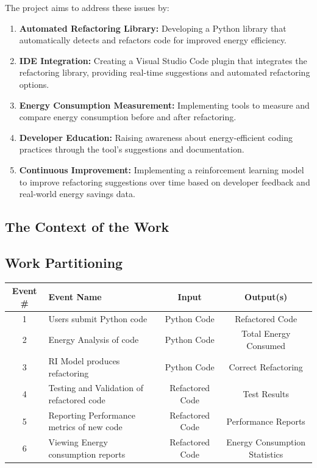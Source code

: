 \documentclass[12pt]{article}
\begin{document}
  The project aims to address these issues by:
  \begin{enumerate}
    \item \textbf{Automated Refactoring Library:} Developing a Python library that automatically detects and refactors code for improved energy efficiency.
    \item \textbf{IDE Integration:} Creating a Visual Studio Code plugin that integrates the refactoring library, providing real-time suggestions and automated refactoring options.
    \item \textbf{Energy Consumption Measurement:} Implementing tools to measure and compare energy consumption before and after refactoring.
    \item \textbf{Developer Education:} Raising awareness about energy-efficient coding practices through the tool's suggestions and documentation.
    \item \textbf{Continuous Improvement:} Implementing a reinforcement learning model to improve refactoring suggestions over time based on developer feedback and real-world energy savings data.
  \end{enumerate}  

\subsection{The Context of the Work}


\subsection{Work Partitioning}

\begin{tabular}{ |c|p{2.5cm}|c|c| }
  \hline
  Event \# & Event Name & Input & Output(s) \\
  \hline\hline

  1 & Users submit Python code & Python Code & Refactored Code \\
  2 & Energy Analysis of code & Python Code & Total Energy Consumed \\
  3 & RI Model produces refactoring & Python Code & Correct Refactoring \\
  4 & Testing and Validation of refactored code & Refactored Code & Test Results \\
  5 & Reporting Performance metrics of new code & Refactored Code & Performance Reports \\
  6 & Viewing Energy consumption reports & Refactored Code & Energy Consumption Statistics \\

  \hline
\end{tabular}
\end{document}
